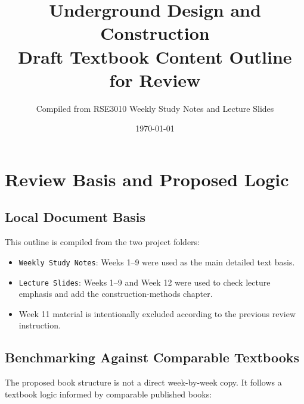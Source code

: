 \documentclass[12pt,oneside]{book}
\title{\textbf{Underground Design and Construction}\\
Draft Textbook Content Outline for Review}
\author{Compiled from RSE3010 Weekly Study Notes and Lecture Slides}
\date{\today}
\begin{document}
\pagestyle{plain}

\maketitle
\tableofcontents

\chapter*{Review Basis and Proposed Logic}

\section*{Local Document Basis}

This outline is compiled from the two project folders:

\begin{itemize}
    \item \texttt{Weekly Study Notes}: Weeks 1--9 were used as the main detailed text basis.
    \item \texttt{Lecture Slides}: Weeks 1--9 and Week 12 were used to check lecture emphasis and add the construction-methods chapter.
    \item Week 11 material is intentionally excluded according to the previous review instruction.
\end{itemize}

\section*{Benchmarking Against Comparable Textbooks}

The proposed book structure is not a direct week-by-week copy. It follows a textbook logic informed by comparable published books:
\end{document}
